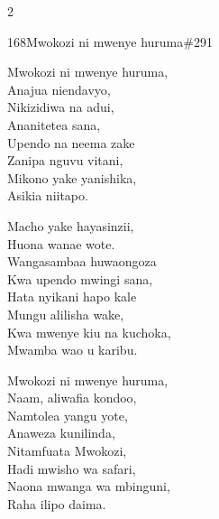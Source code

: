 \begin{multicols}{2}
\begin{hymn}{168}{Mwokozi ni mwenye huruma}{\#291}
\begin{stanza}
Mwokozi ni mwenye huruma,\\
Anajua niendavyo,\\
Nikizidiwa na adui,\\
Ananitetea sana,\\
Upendo na neema zake\\
Zanipa nguvu vitani,\\
Mikono yake yanishika,\\
Asikia niitapo.
\end{stanza}
\begin{stanza}
Macho yake hayasinzii,\\
Huona wanae wote.\\
Wangasambaa huwaongoza\\
Kwa upendo mwingi sana,\\
Hata nyikani hapo kale\\
Mungu alilisha wake,\\
Kwa mwenye kiu na kuchoka,\\
Mwamba wao u karibu.
\end{stanza}
\begin{stanza}
Mwokozi ni mwenye huruma,\\
Naam, aliwafia kondoo,\\
Namtolea yangu yote,\\
Anaweza kunilinda,\\
Nitamfuata Mwokozi,\\
Hadi mwisho wa safari,\\
Naona mwanga wa mbinguni,\\
Raha ilipo daima.
\end{stanza}
\end{hymn}


\end{multicols}
